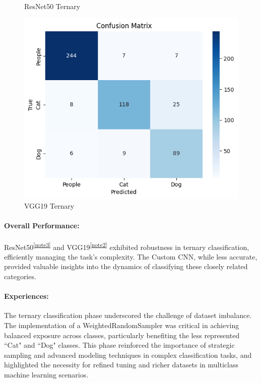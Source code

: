 \documentclass{article} %
\begin{document}
\begin{figure}[htbp]
\begin{minipage}{.3\textwidth}
    \caption{ResNet50 Ternary}
    \label{fig:resnet_cm_ter}
  \end{minipage}%
  \hfill
  \begin{minipage}{.3\textwidth}
    \centering
    \includegraphics[width=\linewidth]{./figure+object/VGG_ternary_BCE.png}
    \caption{VGG19 Ternary}
    \label{fig:vgg_cm_ter}
  \end{minipage}
\end{figure}


\paragraph{Overall Performance:}
ResNet50\textsuperscript{\ref{note3}} and VGG19\textsuperscript{\ref{note2}} exhibited robustness in ternary classification, efficiently managing the task's complexity. The Custom CNN, while less accurate, provided valuable insights into the dynamics of classifying these closely related categories.

\paragraph{Experiences:}
The ternary classification phase underscored the challenge of dataset imbalance. The implementation of a WeightedRandomSampler was critical in achieving balanced exposure across classes, particularly benefiting the less represented ``Cat" and ``Dog" classes. This phase reinforced the importance of strategic sampling and advanced modeling techniques in complex classification tasks, and highlighted the necessity for refined tuning and richer datasets in multiclass machine learning scenarios.
\end{document}

